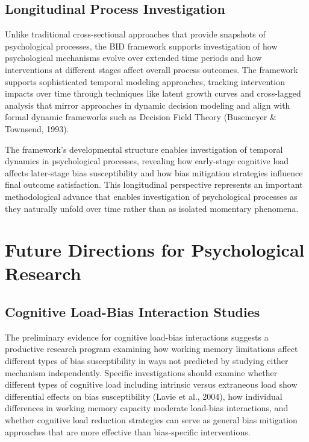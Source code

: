 \documentclass[
  authoryear,
  preprint]{elsarticle}
\begin{document}
\subsection{Longitudinal Process
Investigation}\label{longitudinal-process-investigation}

Unlike traditional cross-sectional approaches that provide snapshots of
psychological processes, the BID framework supports investigation of how
psychological mechanisms evolve over extended time periods and how
interventions at different stages affect overall process outcomes. The
framework supports sophisticated temporal modeling approaches, tracking
intervention impacts over time through techniques like latent growth
curves and cross-lagged analysis that mirror approaches in dynamic
decision modeling and align with formal dynamic frameworks such as
Decision Field Theory (Busemeyer \& Townsend, 1993).

The framework's developmental structure enables investigation of
temporal dynamics in psychological processes, revealing how early-stage
cognitive load affects later-stage bias susceptibility and how bias
mitigation strategies influence final outcome satisfaction. This
longitudinal perspective represents an important methodological advance
that enables investigation of psychological processes as they naturally
unfold over time rather than as isolated momentary phenomena.

\section{Future Directions for Psychological
Research}\label{future-directions-for-psychological-research}

\subsection{Cognitive Load-Bias Interaction
Studies}\label{cognitive-load-bias-interaction-studies}

The preliminary evidence for cognitive load-bias interactions suggests a
productive research program examining how working memory limitations
affect different types of bias susceptibility in ways not predicted by
studying either mechanism independently. Specific investigations should
examine whether different types of cognitive load including intrinsic
versus extraneous load show differential effects on bias susceptibility
(Lavie et al., 2004), how individual differences in working memory
capacity moderate load-bias interactions, and whether cognitive load
reduction strategies can serve as general bias mitigation approaches
that are more effective than bias-specific interventions.
\end{document}
